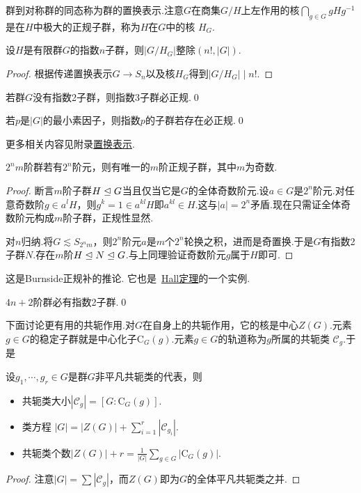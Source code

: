 群到对称群的同态称为群的{\heiti 置换表示}.注意$G$在商集$G/H$上左作用的核$\displaystyle\bigcap_{g\in G}gHg^{-1}$是在$H$中极大的正规子群，称为$H$在$G$中的{\heiti 核} $H_G$.

\begin{thm}[(Poincar\'e)]
	设$H$是有限群$G$的指数$n$子群，则$|G/H_G|$整除$(n!,|G|)$.
\end{thm}
\begin{proof}
	根据传递置换表示$G\to S_n$以及核$H_G$得到$|G/H_G|\mid n!$.
\end{proof}
\begin{cor}
	若群$G$没有指数2子群，则指数3子群必正规.\qed
\end{cor}
\begin{cor}
	若$p$是$|G|$的最小素因子，则指数$p$的子群若存在必正规.\qed
\end{cor}

更多相关内容见附录\hyperref[subsec:PermutationRepresentation]{置换表示}.
\begin{prop}
	$2^nm$阶群若有$2^n$阶元，则有唯一的$m$阶正规子群，其中$m$为奇数.
\end{prop}
\begin{proof}
	断言$m$阶子群$H\trianglelefteq G$当且仅当它是$G$的全体奇数阶元.设$a\in G$是$2^n$阶元.对任意奇数阶$g\in a^lH$，则$g^k=1\in a^{kl}H$即$a^{kl}\in H$.这与$|a|=2^n$矛盾.现在只需证全体奇数阶元构成$m$阶子群，正规性显然.

	对$n$归纳.将$G\lesssim S_{2^nm}$，则$2^n$阶元$a$是$m$个$2^n$轮换之积，进而是奇置换.于是$G$有指数2子群$N$.存在$m$阶$H\trianglelefteq N\trianglelefteq G$.与上同理验证奇数阶元$g$属于$H$即可.
\end{proof}
\begin{remark}
	这是Burnside正规补的推论.%
	它也是~\hyperlink{thm:Hall}{Hall定理}的一个实例.
\end{remark}
\begin{cor*}
	$4n+2$阶群必有指数2子群.\qed
\end{cor*}

下面讨论更有用的共轭作用.对$G$在自身上的共轭作用，它的核是中心$Z(G)$.元素$g\in G$的稳定子群就是中心化子$\mathrm{C}_G(g)$.元素$g\in G$的轨道称为$g$所属的{\heiti 共轭类} $\mathcal{C}_g$.于是
\begin{thm}
	设$g_1,\cdots,g_r\in G$是群$G$非平凡共轭类的代表，则
	\begin{itemize}
		\item 共轭类大小$|\mathcal{C}_{g}|=[G:\mathrm{C}_G(g)]$.
		\item {\heiti 类方程} $|G|=|Z(G)|+\displaystyle\sum_{i=1}^r|\mathcal{C}_{g_i}|$.
		\item 共轭类个数$|Z(G)|+r=\displaystyle\frac{1}{|G|}\sum_{g\in G}|\mathrm{C}_G(g)|$.
	\end{itemize}
\end{thm}
\begin{proof}
	注意$|G|=\displaystyle\sum|\mathcal{C}_g|$，而$Z(G)$即为$G$的全体平凡共轭类之并.
\end{proof}

